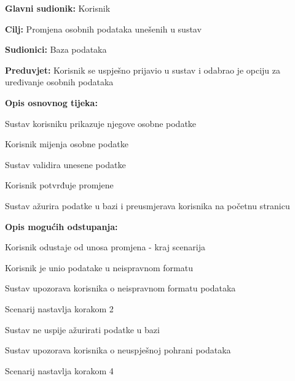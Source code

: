 					\noindent {}
					\begin{packed_item}
	
						\item \textbf{Glavni sudionik: }Korisnik
						\item  \textbf{Cilj:} Promjena osobnih podataka unešenih u sustav
						\item  \textbf{Sudionici:} Baza podataka
						\item  \textbf{Preduvjet:} Korisnik se uspješno prijavio u sustav i odabrao je opciju za uređivanje osobnih podataka
						\item  \textbf{Opis osnovnog tijeka:}
					
						\item[] \begin{packed_enum}
							\item Sustav korisniku prikazuje njegove osobne podatke 
							\item Korisnik mijenja osobne podatke
							\item Sustav validira unesene podatke
							\item Korisnik potvrđuje promjene
							\item Sustav ažurira podatke u bazi i preusmjerava korisnika na početnu stranicu
						\end{packed_enum}

						\item  \textbf{Opis mogućih odstupanja:}

						\item[] \begin{packed_item}
							\item[2.a] Korisnik odustaje od unosa promjena - kraj scenarija
							\item[3.a] Korisnik je unio podatake u neispravnom formatu
							\item[] \begin{packed_enum}
								\item Sustav upozorava korisnika o neispravnom formatu podataka
								\item Scenarij nastavlja korakom 2 
							\end{packed_enum}	
							\item[5.a] Sustav ne uspije ažurirati podatke u bazi
							\item[] \begin{packed_enum}
								\item Sustav upozorava korisnika o neuspješnoj pohrani podataka
								\item Scenarij nastavlja korakom 4
							\end{packed_enum}					
						\end{packed_item}
					\end{packed_item}	
					
